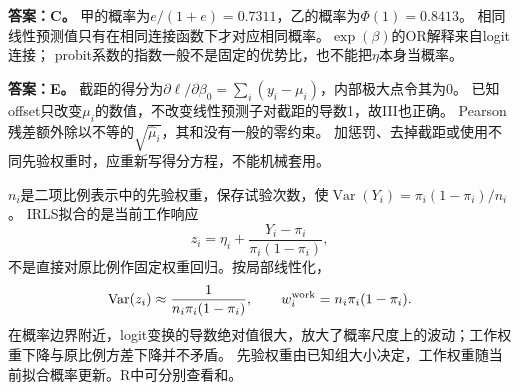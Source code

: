 \textbf{答案：C。} 甲的概率为$e/(1+e)=0.7311$，乙的概率为$\Phi(1)=0.8413$。
相同线性预测值只有在相同连接函数下才对应相同概率。$\exp(\beta)$的OR解释来自logit连接；
probit系数的指数一般不是固定的优势比，也不能把$\eta$本身当概率。
\par\nobreak\smallskip{}

\textbf{答案：E。} 截距的得分为$\partial\ell/\partial\beta_0=\sum_i(y_i-\mu_i)$，内部极大点令其为0。
已知offset只改变$\mu_i$的数值，不改变线性预测子对截距的导数1，故III也正确。
Pearson残差额外除以不等的$\sqrt{\hat\mu_i}$，其和没有一般的零约束。
加惩罚、去掉截距或使用不同先验权重时，应重新写得分方程，不能机械套用。
\par\nobreak\smallskip{}

$n_i$是二项比例表示中的先验权重，保存试验次数，使$\operatorname{Var}(Y_i)=\pi_i(1-\pi_i)/n_i$。
IRLS拟合的是当前工作响应
\[z_i=\eta_i+\frac{Y_i-\pi_i}{\pi_i(1-\pi_i)},\]
不是直接对原比例作固定权重回归。按局部线性化，
\[\operatorname{Var}(z_i)\approx\frac{1}{n_i\pi_i(1-\pi_i)},\qquad
w_i^{\rm work}=n_i\pi_i(1-\pi_i).\]
在概率边界附近，logit变换的导数绝对值很大，放大了概率尺度上的波动；工作权重下降与原比例方差下降并不矛盾。
先验权重由已知组大小决定，工作权重随当前拟合概率更新。R中可分别查看和。
\par\nobreak\smallskip{}

